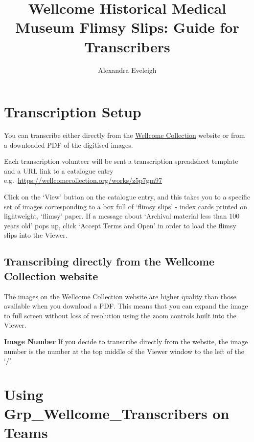 \documentclass[
  openany]{book}
\title{Wellcome Historical Medical Museum Flimsy Slips: Guide for Transcribers}
\author{Alexandra Eveleigh}
\date{}
\begin{document}
\maketitle

{
\setcounter{tocdepth}{1}
\tableofcontents
}
\hypertarget{transcription-setup}{%
\chapter{Transcription Setup}\label{transcription-setup}}

You can transcribe either directly from the \href{https://wellcomecollection.org}{Wellcome Collection} website or from a downloaded PDF of the digitised images.

Each transcription volunteer will be sent a transcription spreadsheet template and a URL link to a catalogue entry
e.g.~\url{https://wellcomecollection.org/works/z5p7gm97}

Click on the `View' button on the catalogue entry, and this takes you to a specific set of images corresponding to a box full of `flimsy slips' - index cards printed on lightweight, `flimsy' paper. If a message about `Archival material less than 100 years old' pops up, click `Accept Terms and Open' in order to load the flimsy slips into the Viewer.

\hypertarget{transcribing-directly-from-the-wellcome-collection-website}{%
\section{Transcribing directly from the Wellcome Collection website}\label{transcribing-directly-from-the-wellcome-collection-website}}

The images on the Wellcome Collection website are higher quality than those available when you download a PDF. This means that you can expand the image to full screen without loss of resolution using the zoom controls built into the Viewer.

\textbf{Image Number} If you decide to transcribe directly from the website, the image number is the number at the top middle of the Viewer window to the left of the `/'.

\hypertarget{using-grp_wellcome_transcribers-on-teams}{%
\chapter{Using Grp\_Wellcome\_Transcribers on Teams}\label{using-grp_wellcome_transcribers-on-teams}}
\end{document}
